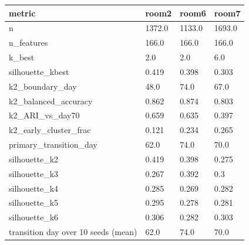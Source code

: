 \begin{tabular}{llll}
\hline
metric & room2 & room6 & room7 \\
\hline
n & 1372.0 & 1133.0 & 1693.0 \\
n\_features & 166.0 & 166.0 & 166.0 \\
k\_best & 2.0 & 2.0 & 6.0 \\
silhouette\_kbest & 0.419 & 0.398 & 0.303 \\
k2\_boundary\_day & 48.0 & 74.0 & 67.0 \\
k2\_balanced\_accuracy & 0.862 & 0.874 & 0.803 \\
k2\_ARI\_vs\_day70 & 0.659 & 0.635 & 0.397 \\
k2\_early\_cluster\_frac & 0.121 & 0.234 & 0.265 \\
primary\_transition\_day & 62.0 & 74.0 & 70.0 \\
silhouette\_k2 & 0.419 & 0.398 & 0.275 \\
silhouette\_k3 & 0.267 & 0.392 & 0.3 \\
silhouette\_k4 & 0.285 & 0.269 & 0.282 \\
silhouette\_k5 & 0.295 & 0.278 & 0.281 \\
silhouette\_k6 & 0.306 & 0.282 & 0.303 \\
transition day over 10 seeds (mean) & 62.0 & 74.0 & 70.0 \\
\hline
\end{tabular}
